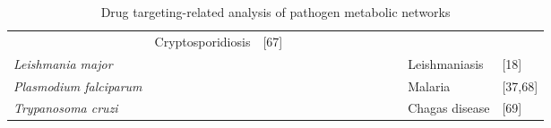 \begin{sidewaystable}
\begin{tabular}{ l  c  c  c  c  c  c  c  c | c  c | c l l }
     & Cryptosporidiosis & [67] \\ \cline{2-12}
\textit{Leishmania major} & 
     \cellcolor[gray]{0.8} & \cellcolor[gray]{0.8} & & \cellcolor[gray]{0.8} & 
     & \cellcolor[gray]{0.8} & & & \cellcolor[gray]{0.8} & & 
     & Leishmaniasis & [18] \\ \cline{2-12}
\textit{Plasmodium falciparum} & 
     \cellcolor[gray]{0.8} & & & \cellcolor[gray]{0.8} & 
     & & & & \cellcolor[gray]{0.8} & \cellcolor[gray]{0.8} & \cellcolor[gray]{0.8}
     & Malaria & [37,68] \\ \cline{2-12}
\textit{Trypanosoma cruzi} & 
     \cellcolor[gray]{0.8} & & & & \cellcolor[gray]{0.8}
     & & & & \cellcolor[gray]{0.8} & &
     & Chagas disease & [69] \\ %
\end{tabular}
\label{trends:table1}
\caption[Drug targeting-related analysis of pathogen metabolic networks]{
          Drug targeting-related analysis of pathogen metabolic networks}
\end{sidewaystable}